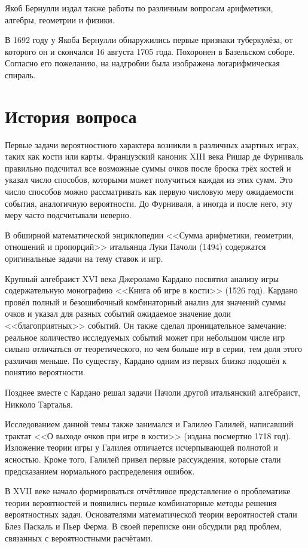 \documentclass[12pt]{extarticle}
\begin{document}
Якоб Бернулли издал также работы по различным вопросам арифметики, алгебры, геометрии и физики. 

В 1692 году у Якоба Бернулли обнаружились первые признаки туберкулёза, от которого он и скончался 16 августа 1705 года. Похоронен в Базельском соборе. Согласно его пожеланию, на надгробии была изображена логарифмическая спираль.

\newpage
\section{История вопроса}
Первые задачи вероятностного характера возникли в различных азартных играх, таких как кости или карты.
Французский каноник XIII века Ришар де Фурниваль правильно подсчитал все возможные суммы очков после броска трёх костей и указал число способов, которыми может получиться каждая из этих сумм. 
Это число способов можно рассматривать как первую числовую меру ожидаемости события, аналогичную вероятности.
До Фурниваля, а иногда и после него, эту меру часто подсчитывали неверно.

В обширной математической энциклопедии <<Сумма арифметики, геометрии, отношений и пропорций>> итальянца Луки Пачоли (1494) содержатся оригинальные задачи на тему ставок и игр.

Крупный алгебраист XVI века Джероламо Кардано посвятил анализу игры содержательную монографию <<Книга об игре в кости>> (1526 год).
Кардано провёл полный и безошибочный комбинаторный анализ для значений суммы очков и указал для разных событий ожидаемое значение доли <<благоприятных>> событий. Он также сделал проницательное замечание: реальное количество исследуемых событий может при небольшом числе игр сильно отличаться от теоретического, но чем больше игр в серии, тем доля этого различия меньше. 
По существу, Кардано одним из первых близко подошёл к понятию вероятности.

Позднее вместе с Кардано решал задачи Пачоли другой итальянский алгебраист, Никколо Тарталья.

Исследованием данной темы также занимался и Галилео Галилей, написавший трактат <<О выходе очков при игре в кости>> (издана посмертно 1718 год).
Изложение теории игры у Галилея отличается исчерпывающей полнотой и ясностью. 
Кроме того, Галилей привел первые рассуждения, которые стали предсказанием нормального распределения ошибок.

В XVII веке начало формироваться отчётливое представление о проблематике теории вероятностей и появились первые комбинаторные методы решения вероятностных задач. 
Основателями математической теории вероятностей стали Блез Паскаль и Пьер Ферма.
В своей переписке они обсудили ряд проблем, связанных с вероятностными расчётами.
\end{document}
